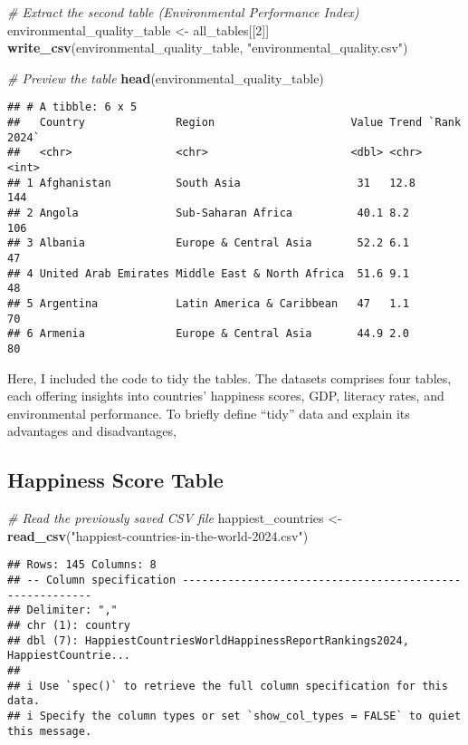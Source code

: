\documentclass[
]{article}
\newenvironment{Shaded}{\begin{snugshade}}{\end{snugshade}}
\newcommand{\CommentTok}[1]{\textcolor[rgb]{0.56,0.35,0.01}{\textit{#1}}}
\newcommand{\DecValTok}[1]{\textcolor[rgb]{0.00,0.00,0.81}{#1}}
\newcommand{\FunctionTok}[1]{\textcolor[rgb]{0.13,0.29,0.53}{\textbf{#1}}}
\newcommand{\NormalTok}[1]{#1}
\newcommand{\OtherTok}[1]{\textcolor[rgb]{0.56,0.35,0.01}{#1}}
\newcommand{\StringTok}[1]{\textcolor[rgb]{0.31,0.60,0.02}{#1}}
\begin{document}
\begin{Shaded}
\begin{Highlighting}[]
\CommentTok{\# Extract the second table (Environmental Performance Index)}
\NormalTok{environmental\_quality\_table }\OtherTok{\textless{}{-}}\NormalTok{ all\_tables[[}\DecValTok{2}\NormalTok{]]}
\FunctionTok{write\_csv}\NormalTok{(environmental\_quality\_table, }\StringTok{"environmental\_quality.csv"}\NormalTok{)}

\CommentTok{\# Preview the table}
\FunctionTok{head}\NormalTok{(environmental\_quality\_table)}
\end{Highlighting}
\end{Shaded}

\begin{verbatim}
## # A tibble: 6 x 5
##   Country              Region                     Value Trend `Rank 2024`
##   <chr>                <chr>                      <dbl> <chr>       <int>
## 1 Afghanistan          South Asia                  31   12.8          144
## 2 Angola               Sub-Saharan Africa          40.1 8.2           106
## 3 Albania              Europe & Central Asia       52.2 6.1            47
## 4 United Arab Emirates Middle East & North Africa  51.6 9.1            48
## 5 Argentina            Latin America & Caribbean   47   1.1            70
## 6 Armenia              Europe & Central Asia       44.9 2.0            80
\end{verbatim}

Here, I included the code to tidy the tables. The datasets comprises
four tables, each offering insights into countries' happiness scores,
GDP, literacy rates, and environmental performance. To briefly define
``tidy'' data and explain its advantages and disadvantages,

\subsection{Happiness Score Table}\label{happiness-score-table}

\begin{Shaded}
\begin{Highlighting}[]
\CommentTok{\# Read the previously saved CSV file}
\NormalTok{happiest\_countries }\OtherTok{\textless{}{-}} \FunctionTok{read\_csv}\NormalTok{(}\StringTok{"happiest{-}countries{-}in{-}the{-}world{-}2024.csv"}\NormalTok{)}
\end{Highlighting}
\end{Shaded}

\begin{verbatim}
## Rows: 145 Columns: 8
## -- Column specification --------------------------------------------------------
## Delimiter: ","
## chr (1): country
## dbl (7): HappiestCountriesWorldHappinessReportRankings2024, HappiestCountrie...
## 
## i Use `spec()` to retrieve the full column specification for this data.
## i Specify the column types or set `show_col_types = FALSE` to quiet this message.
\end{verbatim}
\end{document}
